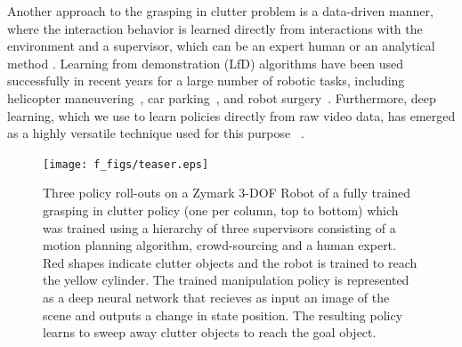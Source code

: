 \documentclass[10pt, conference]{ieeeconf}      %
\begin{document}
Another approach to the grasping in
clutter problem is a data-driven manner, where the interaction behavior is learned directly from interactions with the environment and a supervisor, which can be an expert human or an analytical method \cite{argall2009survey}. Learning from demonstration (LfD) algorithms have been used
successfully in recent years for a large number of robotic tasks, including helicopter
maneuvering~\cite{abbeel2007application}, car parking~\cite{abbeel2008apprenticeship},  and robot
surgery~\cite{van2010superhuman}. Furthermore, deep learning, which we use to learn policies directly from raw video
data, has emerged as a highly versatile technique used for this purpose ~\cite{pinto2015supersizing}.

\begin{figure}
\texttt{[image: f\_figs/teaser.eps]}
\caption{
    \footnotesize
Three policy roll-outs on a Zymark 3-DOF Robot of a fully trained grasping in clutter policy (one per column, top to
bottom) which was trained using a hierarchy of three supervisors consisting of a motion planning algorithm, crowd-sourcing and a human expert. 
Red shapes indicate clutter objects and the robot is trained to reach the yellow cylinder. The trained manipulation
policy is represented as a deep neural network that recieves as input an image of the scene and outputs a change in
state position. The resulting policy learns to sweep away clutter objects to reach the goal object. }
\vspace*{-20pt}
\label{fig:teaser}
\end{figure}

\end{document}
